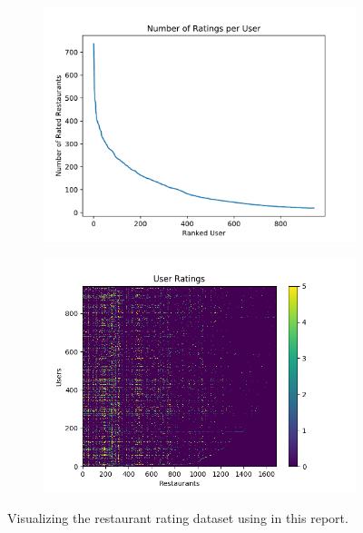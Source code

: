\documentclass[11pt]{article}
\begin{document}
\begin{figure}[h!] \label{fig:somethingelse}
	\centering
	\begin{subfigure}{.5\textwidth}
	  \centering
	  \includegraphics[width=\linewidth]{ratings_per_user}
	  \caption{}
	\end{subfigure}%
	\begin{subfigure}{.5\textwidth}
	  \centering
	  \includegraphics[width=\linewidth]{heatmap}
	  \caption{}
	\end{subfigure}
	\caption{Visualizing the restaurant rating dataset using in this report.}
\end{figure}
\end{document}
